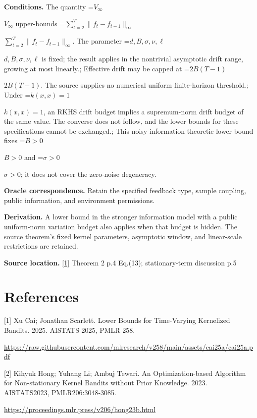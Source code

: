 \documentclass[10pt,a4paper]{article}
\newcommand{\AtlasMath}[1]{\par\begingroup\centering\setbox0=\hbox{$\displaystyle #1$}\ifdim\wd0>1.4\linewidth\typeout{ATLAS WIDE FORMULA: \the\wd0}\fi\ifdim\wd0>\linewidth\resizebox{\linewidth}{!}{\box0}\else\box0\fi\par\endgroup}
\newcommand{\AtlasInlineMath}[1]{\begingroup\setbox0=\hbox{$#1$}\ifdim\wd0>.4\linewidth\endgroup\AtlasMath{#1}\else\endgroup$#1$\fi}
\begin{document}
\textbf{Conditions.} The quantity \AtlasInlineMath{V_\infty} upper-bounds \AtlasInlineMath{\sum_{t=2}^T\|f_t-f_{t-1}\|_\infty}. The parameter \AtlasInlineMath{d,B,\sigma,\nu,\ell} is fixed; the result applies in the nontrivial asymptotic drift range, growing at most linearly.; Effective drift may be capped at \AtlasInlineMath{2B(T-1)}. The source supplies no numerical uniform finite-horizon threshold.; Under \AtlasInlineMath{k(x,x)=1}, an RKHS drift budget implies a supremum-norm drift budget of the same value. The converse does not follow, and the lower bounds for these specifications cannot be exchanged.; This noisy information-theoretic lower bound fixes \AtlasInlineMath{B>0} and \AtlasInlineMath{\sigma>0}; it does not cover the zero-noise degeneracy.

\textbf{Oracle correspondence.} Retain the specified feedback type, sample coupling, public information, and environment permissions.

\textbf{Derivation.} A lower bound in the stronger information model with a public uniform-norm variation budget also applies when that budget is hidden. The source theorem’s fixed kernel parameters, asymptotic window, and linear-scale restrictions are retained.

\textbf{Source location.} \href{https://raw.githubusercontent.com/mlresearch/v258/main/assets/cai25a/cai25a.pdf}{[1]} Theorem 2 p.4 Eq.(13); stationary-term discussion p.5

\section{References}
[1] Xu Cai; Jonathan Scarlett. Lower Bounds for Time-Varying Kernelized Bandits. 2025. AISTATS 2025, PMLR 258.

\url{https://raw.githubusercontent.com/mlresearch/v258/main/assets/cai25a/cai25a.pdf}

[2] Kihyuk Hong; Yuhang Li; Ambuj Tewari. An Optimization-based Algorithm for Non-stationary Kernel Bandits without Prior Knowledge. 2023. AISTATS2023, PMLR206:3048-3085.

\url{https://proceedings.mlr.press/v206/hong23b.html}
\end{document}
